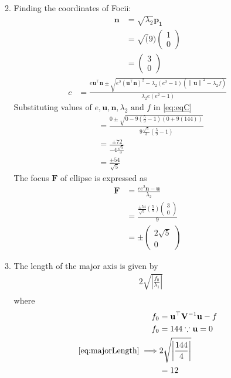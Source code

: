 \documentclass[12pt]{article}
\providecommand{\brak}[1]{\ensuremath{\left(#1\right)}}
\providecommand{\norm}[1]{\left\lVert#1\right\rVert}
\providecommand{\abs}[1]{\left\vert#1\right\vert}
\newcommand{\myvec}[1]{\ensuremath{\begin{pmatrix}#1\end{pmatrix}}}
\let\vec\mathbf
\begin{document}
\begin{enumerate}
\begin{enumerate}
\begin{align}
\end{align}
\item Finding the coordinates of Focii: 
\begin{align}
	\vec{n} &= \sqrt{\lambda_2}\vec{p_1} \\
	&= \sqrt(9)\myvec{1 \\ 0} \\
	\label{eq:eqN}
	&= \myvec{3 \\ 0} 
\end{align}
\begin{align}
	\label{eq:eqC}
	c  &=    \frac{e\vec{u}^{\top}\vec{n} \pm \sqrt{e^2\brak{\vec{u}^{\top}\vec{n}}^2-\lambda_2\brak{e^2-1}\brak{\norm{\vec{u}}^2 - \lambda_2 f}}}{\lambda_2e\brak{e^2-1}} 
\end{align}
Substituting values of $e, \vec{u}, \vec{n}, \lambda_2 \text{ and } f$ in \eqref{eq:eqC}
\begin{align}
	&=    \frac{0 \pm \sqrt{0-9\brak{\frac{5}{9}-1}\brak{{0 + 9\brak{144}}}}}{9\frac{\sqrt{5}}{3}\brak{\frac{5}{9}-1}} \\ 
	&=    \frac{ \pm 72}{-4\frac{\sqrt{5}}{3}}  \\ 
	&=    \frac{ \pm 54}{\sqrt{5}} 
\end{align}
The focus $\vec{F}$ of ellipse is expressed as
\begin{align}
	\vec{F} &= \frac{ce^2\vec{n}-\vec{u}}{\lambda_2} \\
	&= \frac{\frac{ \pm 54}{\sqrt{5}} \brak{\frac{5}{9}}\myvec{3 \\0}}{9} \\
	&= \pm \myvec{2\sqrt{5} \\ 0}
\end{align}
\item  The length of the major axis is given by
\begin{align}
	\label{eq:majorLength}
	& 2\sqrt{\abs{\frac{f_0}{\lambda_1}}}\\
\end{align}
where
\begin{align}
	 f_0 &= \vec{u}^\top\vec{V}^{-1}\vec{u}-f \\
	 f_0 &= 144 \because \vec{u} = 0 \\
	\eqref{eq:majorLength} \implies  & 2\sqrt{\abs{\frac{144}{4}}}\\
	&= 12
\end{align}


\end{enumerate}
\end{enumerate}
\end{document}
